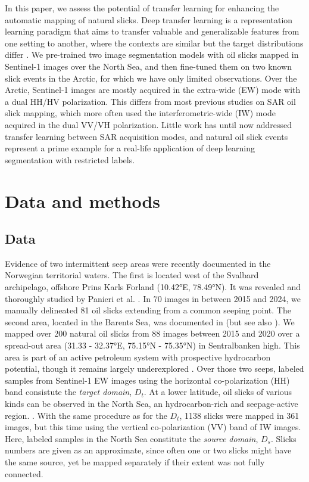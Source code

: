 \documentclass[journal]{IEEEtran}
\begin{document}
In this paper, we assess the potential of transfer learning for enhancing the automatic mapping of natural slicks. 
Deep transfer learning is a representation learning paradigm that aims to transfer valuable and generalizable features from one setting to another, where the contexts are similar but the target distributions differ 
\cite{goodfellowDeepLearning2016}.
We pre-trained two image segmentation models with oil slicks mapped in Sentinel-1 images over the North Sea, and then fine-tuned them on two known slick events in the 
Arctic, for which we have only limited observations. Over the Arctic, Sentinel-1 images are mostly acquired in the extra-wide (EW) mode with a dual HH/HV polarization. This differs from most previous studies 
on SAR oil slick mapping, which more often used the interferometric-wide (IW) mode acquired in the dual VV/VH polarization. Little work has until now addressed transfer learning between SAR acquisition modes, 
and natural oil slick events represent a prime example for a real-life application of deep learning segmentation with restricted labels. 

\section{Data and methods}
\subsection{Data}
Evidence of two intermittent seep areas were recently documented in the Norwegian territorial waters. The first is located west of the Svalbard archipelago, offshore Prins Karls Forland (10.42°E, 78.49°N). 
It was revealed and thoroughly studied by Panieri et al. \cite{panieriArcticNaturalOil2024}. In 70 images in between 2015 and 2024, we manually delineated 81 oil slicks extending from a common seeping point.
The second area, located in the Barents Sea, was documented in \cite{serovWidespreadNaturalMethane2023} (but see also \cite{ivanovSearchDetectionNatural2020}). We mapped over 200 natural oil slicks from 88 images between 
2015 and 2020 over a spread-out area (31.33 - 32.37°E, 75.15°N - 75.35°N) in Sentralbanken high. This area is part of an active petroleum system with prospective hydrocarbon potential, though it remains largely 
underexplored \cite{lundschienNorthBarentsComposite2025}. Over those two seeps, labeled samples from Sentinel-1 EW images using the horizontal co-polarization (HH) band consistute the \textit{target domain}, $\mathit{D}_t$. 
At a lower latitude, oil slicks of various kinds can be observed in the North Sea, an hydrocarbon-rich and seepage-active region. \cite{juddSeabedFluidFlow2009,hovlandSeabedPockmarksSeepages1988}. 
With the same procedure as for the $\mathit{D}_t$, 1138 slicks were mapped in 361 images, but this time using the vertical co-polarization (VV) band of IW images. Here, labeled samples in the North Sea constitute the 
\textit{source domain}, $\mathit{D}_s$. Slicks numbers are given as an approximate, since often one or two slicks might have the same source, yet be mapped separately if their extent was not fully connected.
\end{document}
